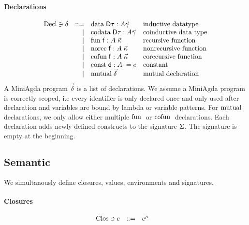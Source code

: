 \paragraph*{Declarations}
\[
\begin{array}{lrll}
\mathrm{Decl} \ni \delta & ::= & \mathrm{data}\; \mathsf{D} \tau : A \vec{\gamma} & \mbox{inductive datatype}\\ 
& \mid & \mathrm{codata}\; \mathsf{D} \tau : A \vec{\gamma} & \mbox{coinductive data type} \\
& \mid & \mathrm{fun}\; \mathsf{f} : A \; \vec{\kappa} & \mbox{recursive function}\\
& \mid & \mathrm{norec}\; \mathsf{f} : A \; \vec{\kappa} & \mbox{nonrecursive function}\\
& \mid & \mathrm{cofun}\; \mathsf{f} : A \; \vec{\kappa} & \mbox{corecursive function}\\ 
& \mid & \mathrm{const}\; \mathsf{d} : A \; = e & \mbox{constant}\\
& \mid & \mathrm{mutual}\; \vec{\delta} & \mbox{mutual declaration}
\end{array}
\]
A MiniAgda program $\vec{\delta}$ is a list of declarations.
We assume a MiniAgda program is correctly scoped, i.e every identifier
is only declared once and only used after declaration and variables are bound by lambda or variable patterns.
For $\mathrm{mutual}\;$ declarations, we only allow either multiple $\mathrm{fun}\;$ or $\mathrm{cofun}\;$ declarations.
Each declaration adds newly defined constructs to the signature $\mathrm{\Sigma}$.
The signature is empty at the beginning.
\subsection{Semantic}
We simultanously define closures, values, environments and signatures.

\paragraph*{Closures}
\[
\begin{array}{lrll}
\mathrm{Clos} \ni c & ::= & e^{\rho} & 
\end{array}
\]

